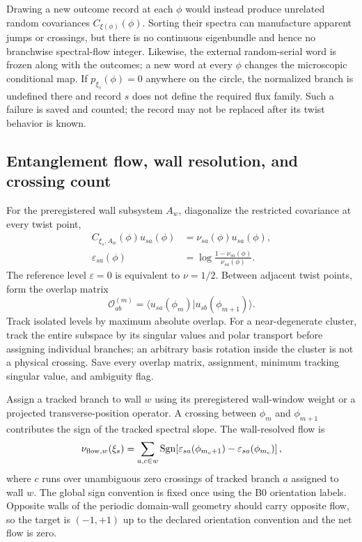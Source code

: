 \documentclass[aps,prx,twocolumn,floatfix,nofootinbib,superscriptaddress,longbibliography]{revtex4-2}
\DeclareMathOperator{\Sgn}{Sgn}
\begin{document}
Drawing a new outcome record at each $\phi$ would instead produce unrelated random
covariances $C_{\xi(\phi)}(\phi)$.  Sorting their spectra can manufacture apparent jumps or
crossings, but there is no continuous eigenbundle and hence no branchwise spectral-flow
integer.  Likewise, the external random-serial word is frozen along with the outcomes; a
new word at every $\phi$ changes the microscopic conditional map.  If
$p_{\xi_s}(\phi)=0$ anywhere on the circle, the normalized branch is undefined there and
record $s$ does not define the required flux family.  Such a failure is saved and counted;
the record may not be replaced after its twist behavior is known.

\subsection{Entanglement flow, wall resolution, and crossing count}

For the preregistered wall subsystem $A_w$, diagonalize the restricted covariance at every
twist point,
\begin{equation}
 \begin{aligned}
 C_{\xi_s,A_w}(\phi)u_{sa}(\phi)
 &=\nu_{sa}(\phi)u_{sa}(\phi),\\
 \varepsilon_{sa}(\phi)
 &=\log\frac{1-\nu_{sa}(\phi)}{\nu_{sa}(\phi)}.
 \end{aligned}
 \label{eq:twist-entanglement-spectrum}
\end{equation}
The reference level $\varepsilon=0$ is equivalent to $\nu=1/2$.  Between adjacent twist
points, form the overlap matrix
\begin{equation}
 \mathcal O_{ab}^{(m)}
 =\langle u_{sa}(\phi_m)|u_{sb}(\phi_{m+1})\rangle.
 \label{eq:twist-overlap-matrix}
\end{equation}
Track isolated levels by maximum absolute overlap.  For a near-degenerate cluster, track
the entire subspace by its singular values and polar transport before assigning individual
branches; an arbitrary basis rotation inside the cluster is not a physical crossing.
Save every overlap matrix, assignment, minimum tracking singular value, and ambiguity
flag.

Assign a tracked branch to wall $w$ using its preregistered wall-window weight or a
projected transverse-position operator.  A crossing between $\phi_m$ and
$\phi_{m+1}$ contributes the sign of the tracked spectral slope.  The wall-resolved flow
is
\begin{equation}
 \nu_{{\rm flow},w}(\xi_s)
 =\sum_{a,c\in w}
 \Sgn\!\left[\varepsilon_{sa}(\phi_{m_c+1})
             -\varepsilon_{sa}(\phi_{m_c})\right],
 \label{eq:wall-twist-flow-count}
\end{equation}
where $c$ runs over unambiguous zero crossings of tracked branch $a$ assigned to wall
$w$.  The global sign convention is fixed once using the B0 orientation labels.  Opposite
walls of the periodic domain-wall geometry should carry opposite flow, so the target is
$(-1,+1)$ up to the declared orientation convention and the net flow is zero.
\end{document}
